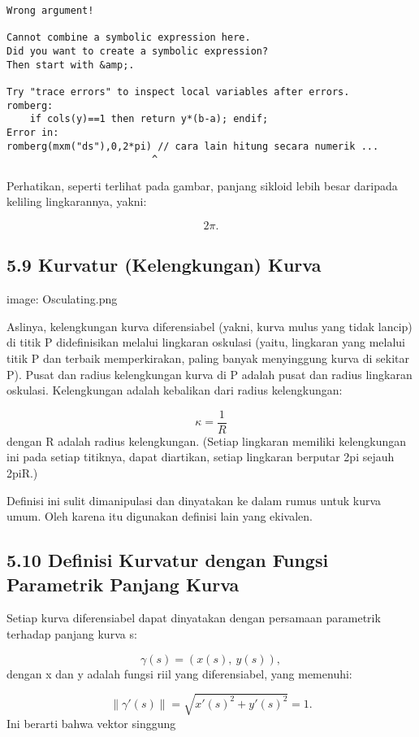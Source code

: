 \documentclass[
]{book}
\begin{document}
\begin{verbatim}
Wrong argument!

Cannot combine a symbolic expression here.
Did you want to create a symbolic expression?
Then start with &amp;.

Try "trace errors" to inspect local variables after errors.
romberg:
    if cols(y)==1 then return y*(b-a); endif;
Error in:
romberg(mxm("ds"),0,2*pi) // cara lain hitung secara numerik ...
                         ^
\end{verbatim}

Perhatikan, seperti terlihat pada gambar, panjang sikloid lebih besar daripada keliling lingkarannya, yakni:

\[2\pi.\] 

\subsection{5.9 Kurvatur (Kelengkungan) Kurva}

image: Osculating.png

Aslinya, kelengkungan kurva diferensiabel (yakni, kurva mulus yang tidak lancip) di titik P didefinisikan melalui lingkaran oskulasi (yaitu, lingkaran yang melalui titik P dan terbaik memperkirakan, paling banyak menyinggung kurva di sekitar P). Pusat dan radius kelengkungan kurva di P adalah pusat dan radius lingkaran oskulasi. Kelengkungan adalah kebalikan dari radius kelengkungan:

\[\kappa =\frac {1}{R}\]dengan R adalah radius kelengkungan. (Setiap lingkaran memiliki kelengkungan ini pada setiap titiknya, dapat diartikan, setiap lingkaran berputar 2pi sejauh 2piR.)

Definisi ini sulit dimanipulasi dan dinyatakan ke dalam rumus untuk kurva umum. Oleh karena itu digunakan definisi lain yang ekivalen.

\subsection{5.10 Definisi Kurvatur dengan Fungsi Parametrik Panjang Kurva}\label{definisi-kurvatur-dengan-fungsi-parametrik-panjang-kurva}

Setiap kurva diferensiabel dapat dinyatakan dengan persamaan parametrik terhadap panjang kurva s:

\[\gamma(s) = (x(s),\ y(s)),\]dengan x dan y adalah fungsi riil yang diferensiabel, yang memenuhi:

\[\|\gamma'(s)\|=\sqrt{x'(s)^2+y'(s)^2}=1.\]Ini berarti bahwa vektor singgung
\end{document}
